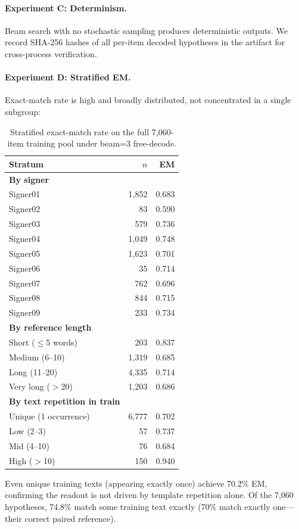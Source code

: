 \documentclass[pdflatex,sn-chicago]{sn-jnl}
\begin{document}
\paragraph{Experiment C: Determinism.}
Beam search with no stochastic sampling produces deterministic outputs. We record SHA-256 hashes of all per-item decoded hypotheses in the artifact for cross-process verification.

\paragraph{Experiment D: Stratified EM.}
Exact-match rate is high and broadly distributed, not concentrated in a single subgroup:
\begin{table}[h]
\centering
\scriptsize
\caption{Stratified exact-match rate on the full 7{,}060-item training pool under beam=3 free-decode.}
\label{tab:stratified_em}
\begin{tabular}{lrr}
\toprule
Stratum & $n$ & EM \\
\midrule
\textbf{By signer} & & \\
Signer01 & 1{,}852 & 0.683 \\
Signer02 & 83 & 0.590 \\
Signer03 & 579 & 0.736 \\
Signer04 & 1{,}049 & 0.748 \\
Signer05 & 1{,}623 & 0.701 \\
Signer06 & 35 & 0.714 \\
Signer07 & 762 & 0.696 \\
Signer08 & 844 & 0.715 \\
Signer09 & 233 & 0.734 \\
\midrule
\textbf{By reference length} & & \\
Short ($\leq$5 words) & 203 & 0.837 \\
Medium (6--10) & 1{,}319 & 0.685 \\
Long (11--20) & 4{,}335 & 0.714 \\
Very long ($>$20) & 1{,}203 & 0.686 \\
\midrule
\textbf{By text repetition in train} & & \\
Unique (1 occurrence) & 6{,}777 & 0.702 \\
Low (2--3) & 57 & 0.737 \\
Mid (4--10) & 76 & 0.684 \\
High ($>$10) & 150 & 0.940 \\
\bottomrule
\end{tabular}
\end{table}
Even unique training texts (appearing exactly once) achieve 70.2\% EM, confirming the readout is not driven by template repetition alone. Of the 7{,}060 hypotheses, 74.8\% match some training text exactly (70\% match exactly one---their correct paired reference).
\end{document}
